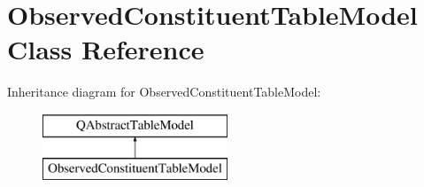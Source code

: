 \hypertarget{class_observed_constituent_table_model}{}\section{Observed\+Constituent\+Table\+Model Class Reference}
\label{class_observed_constituent_table_model}
Inheritance diagram for Observed\+Constituent\+Table\+Model\+:\begin{figure}[H]
\begin{center}
\leavevmode
\includegraphics[height=2.000000cm]{class_observed_constituent_table_model}
\end{center}
\end{figure}
